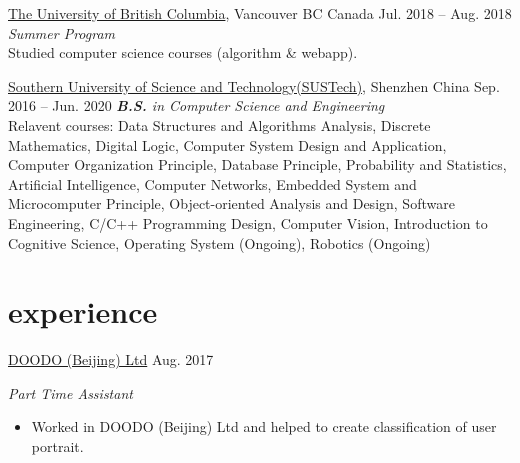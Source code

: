 \documentclass[hidelinks__VERSION__]{adamyi-cv}
\begin{document}
\begin{entrylist}


\entry
{\href{https://www.ubc.ca/}{The University of British Columbia}, Vancouver BC Canada}
{Jul. 2018 -- Aug. 2018}
{\emph{Summer Program}\\
Studied computer science courses (algorithm \& webapp).
}


\entry
{\href{https://www.sustech.edu.cn/}{Southern University of Science and Technology(SUSTech)}, Shenzhen China}
{Sep. 2016 -- Jun. 2020}
{\emph{\textbf{B.S.} in Computer Science and Engineering}\\
Relavent courses: Data Structures and Algorithms Analysis, Discrete Mathematics, Digital Logic, Computer System Design and Application, Computer Organization Principle, Database Principle, Probability and Statistics, Artificial Intelligence, Computer Networks, Embedded System and Microcomputer Principle, Object-oriented Analysis and Design, Software Engineering, C/C++ Programming Design, Computer Vision, Introduction to Cognitive Science, Operating System (Ongoing), Robotics (Ongoing)
}

\end{entrylist}


\section{experience}

\begin{entrylist}


\entry
{\href{http://www.doodod.com/}{DOODO (Beijing) Ltd}}
{Aug. 2017}
{\emph{Part Time Assistant}
\begin{itemize}
\item Worked in DOODO (Beijing) Ltd and helped to create classification of user portrait.
\end{itemize}}


\end{entrylist}
\end{document}
